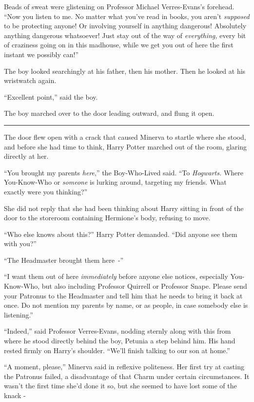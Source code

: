 Beads of sweat were glistening on Professor Michael Verres-Evans's forehead. ``Now you listen to me. No matter what you've read in books, you aren't \emph{supposed} to be protecting anyone! Or involving yourself in anything dangerous! Absolutely anything dangerous whatsoever! Just stay out of the way of \emph{everything,} every bit of craziness going on in this madhouse, while we get you out of here the first instant we possibly can!''

The boy looked searchingly at his father, then his mother. Then he looked at his wristwatch again.

``Excellent point,'' said the boy.

The boy marched over to the door leading outward, and flung it open.

\begin{center}\rule{3in}{0.4pt}\end{center}

The door flew open with a crack that caused Minerva to startle where she stood, and before she had time to think, Harry Potter marched out of the room, glaring directly at her.

``You brought my parents \emph{here},'' the Boy-Who-Lived said. ``To \emph{Hogwarts.} Where You-Know-Who or \emph{someone} is lurking around, targeting my friends. What exactly were you thinking?''

She did not reply that she had been thinking about Harry sitting in front of the door to the storeroom containing Hermione's body, refusing to move.

``Who else knows about this?'' Harry Potter demanded. ``Did anyone see them with you?''

``The Headmaster brought them here~-''

``I want them out of here \emph{immediately} before anyone else notices, especially You-Know-Who, but also including Professor Quirrell or Professor Snape. Please send your Patronus to the Headmaster and tell him that he needs to bring it back at once. Do not mention my parents by name, or as people, in case somebody else is listening.''

``Indeed,'' said Professor Verres-Evans, nodding sternly along with this from where he stood directly behind the boy, Petunia a step behind him. His hand rested firmly on Harry's shoulder. ``We'll finish talking to our son at home.''

``A moment, please,'' Minerva said in reflexive politeness. Her first try at casting the Patronus failed, a disadvantage of that Charm under certain circumstances. It wasn't the first time she'd done it so, but she seemed to have lost some of the knack -

